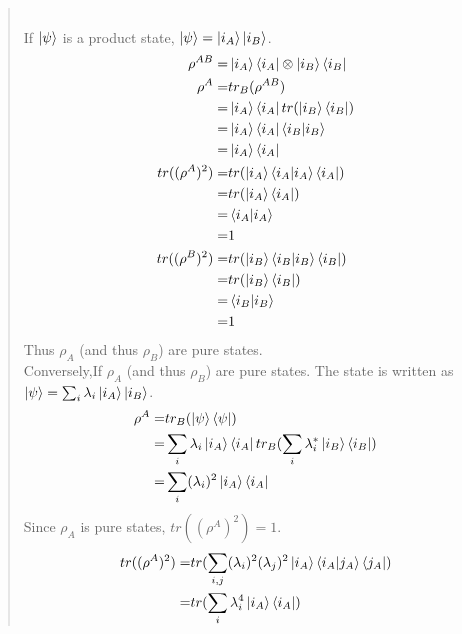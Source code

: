 \documentclass[UTF8]{ctexart}
\begin{document}
\begin{quote}
	\\
If $ \ket{\psi}$ is a product state, $\ket{\psi}=\ket{i_{A}}\ket{i_{B}}$.\\
\begin{equation}
	\begin{aligned}
		\rho^{AB}=&\ket{i_{A}}\bra{i_{A}}\otimes \ket{i_{B}}\bra{i_{B}} \\
		 \rho^{A}=&tr_{B}(\rho^{AB}) \\
				  =&\ket{i_{A}}\bra{i_{A}}tr(\ket{i_{B}}\bra{i_{B}}) \\
				  =&\ket{i_{A}}\bra{i_{A}}\bra{i_{B}}\ket{i_{B}} \\
				  =&\ket{i_{A}}\bra{i_{A}} \\
 tr( (\rho^{A})^{2})=&tr(\ket{i_{A}}\bra{i_{A}}\ket{i_{A}}\bra{i_{A}}) \\
				  =&tr(\ket{i_{A}}\bra{i_{A}})\\
				  =&\bra{i_{A}}\ket{i_{A}} \\
				  =&1 \\
 tr( (\rho^{B})^{2})=&tr(\ket{i_{B}}\bra{i_{B}}\ket{i_{B}}\bra{i_{B}}) \\
				  =&tr(\ket{i_{B}}\bra{i_{B}})\\
				  =&\bra{i_{B}}\ket{i_{B}} \\
				  =&1 \\
	\end{aligned}
\end{equation}
Thus $\rho_{A}$ (and thus  $\rho_{B}$) are pure states.
\\
Conversely,If $\rho_{A}$ (and thus  $\rho_{B}$) are pure states. The state is written as 
$\ket{\psi}=\sum_{i}\lambda_{i}\ket{i_{A}}\ket{i_{B}}$.
\begin{equation}
	\begin{aligned}
		\rho^{A}=&tr_{B}(\ket{\psi}\bra{\psi})\\
				=&\sum_{i}\lambda_{i}\ket{i_{A}}\bra{i_{A}}tr_{B}(\sum_{i}\lambda_{i}^{*}\ket{i_{B}}\bra{i_{B}}) \\
				=&\sum_{i}(\lambda_{i})^{2}\ket{i_{A}}\bra{i_{A}} \\
	\end{aligned}
\end{equation}
Since  $\rho_{A}$ is pure states, $tr((\rho^{A})^{2})=1$.
\begin{equation}
	\begin{aligned}
		tr((\rho^{A})^{2})=&tr(\sum_{i,j}(\lambda_{i})^{2}(\lambda_{j})^{2}\ket{i_{A}}\bra{i_{A}}\ket{j_{A}}\bra{j_{A}})\\
						  =&tr(\sum_{i}\lambda_{i}^{4}\ket{i_{A}}\bra{i_{A}})\\

\end{aligned}
\end{equation}
\end{quote}
\end{document}
